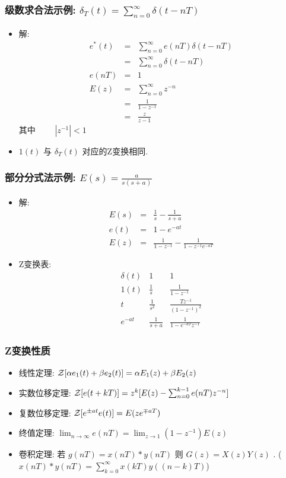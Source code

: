 \documentclass[table]{article}
\begin{document}
\begin{frame}
\frametitle{级数求合法示例: $\delta_T(t)=\sum_{n=0}^{\infty}\delta(t-nT)$}
\label{sec-3-1-4}

\begin{itemize}
\item <2->解:
      \begin{eqnarray*}
      e^*(t) & = & \sum_{n=0}^{\infty}e(nT)\delta(t-nT) \\
       &=& \sum_{n=0}^{\infty}\delta(t-nT) \\
      e(nT) &=& 1\\
      E(z) &=& \sum_{n=0}^{\infty}z^{-n}\\
       &=& \frac{1}{1-z^{-1}} \\
      &=& \frac{z}{z-1}
      \end{eqnarray*}
      其中 $\qquad |z^{-1}|<1$
\item <3->$1(t)$  与  $\delta_T(t)$  对应的Z变换相同.
\end{itemize}
\end{frame}
\begin{frame}
\frametitle{部分分式法示例:  $E(s)=\frac{a}{s(s+a)}$}
\label{sec-3-1-5}

\begin{itemize}
\item <2->解:
      \begin{eqnarray*}
      E(s) & = & \frac{1}{s}-\frac{1}{s+a}\\
      e(t) &=& 1-e^{-at} \\
      E(z) &=& \frac{1}{1-z^{-1}} -\frac{1}{1-z^{-1}e^{-aT}}
      \end{eqnarray*}
\item <3->Z变换表:
      \[\begin{matrix}
      \delta(t) & 1 & 1 \\
      1(t) & \frac{1}{s} & \frac{1}{1-z^{-1}} \\
      t & \frac{1}{s^2} & \frac{Tz^{-1}}{(1-z^{-1})^2} \\
      e^{-at} & \frac{1}{s+a} &\frac{1}{1-e^{-aT}z^{-1}}
      \end{matrix}\]
\end{itemize}
\end{frame}
\begin{frame}
\frametitle{Z变换性质}
\label{sec-3-1-6}

\begin{itemize}
\item <2->线性定理:    ${\cal Z}[\alpha e_1(t)+\beta e_2(t)]=\alpha E_1(z)+\beta E_2(z)$
\item <3->实数位移定理:  ${\cal Z}[e(t+kT)] = z^k[E(z)-\sum_{n=0}^{k-1}e(nT)z^{-n}]$
\item <4->复数位移定理:  ${\cal Z}[e^{\pm at}e(t)] = E(ze^{\mp aT})$
\item <5->终值定理:  $\lim_{n\rightarrow\infty}e(nT)=\lim_{z\rightarrow 1}(1-z^{-1})E(z)$
\item <6->卷积定理: 若  $g(nT)=x(nT)*y(nT)$  则  $G(z)=X(z)Y(z)$  . ($x(nT)*y(nT)=\sum_{k=0}^{\infty}x(kT)y((n-k)T)$)
\end{itemize}
\end{frame}
\end{document}
